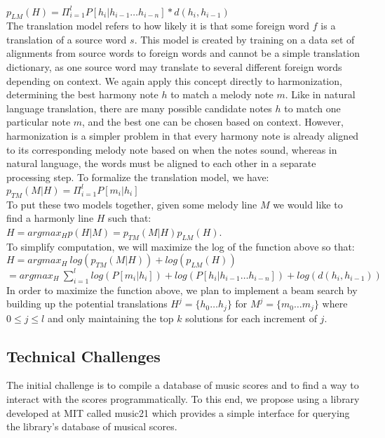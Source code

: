 \documentclass{sig-alternate}
\begin{document}
$p_{LM}(H) = \Pi_{i = 1}^{l} P[h_{i} | h_{i - 1} \ldots h_{i - n}] * d(h_{i}, h_{i-1})$\\

The translation model refers to how likely it is that some foreign word $f$ is
a translation of a source word $s$. This model is created by training on a data set of alignments from source words to foreign words and cannot be a simple translation dictionary, as one source word may translate to several different foreign words depending on
context. We again apply this concept directly to harmonization, determining the best harmony note $h$ to match a melody note $m$. Like in natural language translation, there are many possible candidate notes $h$ to match one particular note $m$, and the best one can be chosen based on context. However, harmonization is a simpler problem in that every harmony note is already aligned to its corresponding melody note based on when the notes sound, whereas in natural language, the words must be aligned to each other in a separate processing step. To formalize the translation model, we have:\\

$p_{TM}(M | H) = \Pi_{i = 1}^{l} P[m_{i} | h_{i}]$\\

To put these two models together, given some melody line $M$ we would like to find a harmonly line $H$ such that:\\

$H = argmax_{H}p(H | M) = p_{TM}(M | H)p_{LM}(H)$.\\

To simplify computation, we will maximize the log of the function above so that:\\

$H = argmax_{H}\ log(p_{TM}(M | H)) + log(p_{LM}(H))$\\

$= argmax_{H}\ \sum_{i = 1}^{l} log(P[m_{i} | h_{i}]) + log(P[h_{i} | h_{i - 1} \ldots h_{i - n}]) + log(d(h_{i}, h_{i-1}))$\\

In order to maximize the function above, we plan to implement a beam search by building up the potential translations $H^{j} = \{h_{0} \ldots h_{j}\}$ for $M^{j} = \{m_{0} \ldots m_{j}\}$ where $0 \leq j \leq l$ and only maintaining the top $k$ solutions for each increment of $j$.\\

\subsection{Technical Challenges}
\label{subsec:tech_challenges}
The initial challenge is to compile a database of music scores and to find a way to interact with
the scores programmatically. To this end, we propose using a library developed at MIT called music21 \cite{Cuthbert_music21:a}
which provides a simple interface for querying the library's database of musical scores.
\end{document}
